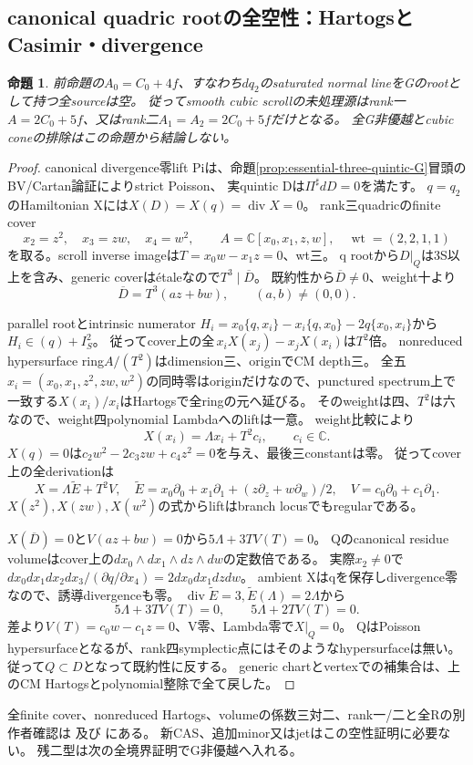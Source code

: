 \documentclass[a4paper,11pt]{ltjsarticle}
\newtheorem{proposition}{命題}[section]
\theoremstyle{definition}
\begin{document}
\subsection{canonical quadric rootの全空性：HartogsとCasimir・divergence}
\begin{proposition}\label{prop:cubic-scroll-canonical-root-empty}
前命題の$A_0=C_0+4f$、すなわち$dq_2$のsaturated normal lineをGのrootとして持つ全sourceは空。
従ってsmooth cubic scrollの未処理源はrank一$A=2C_0+5f$、又はrank二$A_1=A_2=2C_0+5f$だけとなる。
全G非優越とcubic coneの排除はこの命題から結論しない。
\end{proposition}
\begin{proof}
canonical divergence零lift Piは、命題\ref{prop:essential-three-quintic-G}冒頭のBV/Cartan論証によりstrict Poisson、
実quintic Dは$\Pi^\sharp dD=0$を満たす。
$q=q_2$のHamiltonian Xには$X(D)=X(q)=\operatorname{div}X=0$。
rank三quadricのfinite cover
\[
 x_2=z^2,\quad x_3=zw,\quad x_4=w^2,\qquad
 A=\mathbb C[x_0,x_1,z,w],\quad\operatorname{wt}=(2,2,1,1)
\]
を取る。scroll inverse imageは$T=x_0w-x_1z=0$、wt三。
q rootから$D|_Q$は3S以上を含み、generic coverはétaleなので$T^3\mid\overline D$。
既約性から$\overline D\ne0$、weight十より
\[
 \overline D=T^3(az+bw),\qquad(a,b)\ne(0,0).
\]

parallel rootとintrinsic numerator
$H_i=x_0\{q,x_i\}-x_i\{q,x_0\}-2q\{x_0,x_i\}$から$H_i\in(q)+I_S^2$。
従ってcover上の全$\,x_iX(x_j)-x_jX(x_i)$は$T^2$倍。
nonreduced hypersurface ring$A/(T^2)$はdimension三、originでCM depth三。
全五$x_i=(x_0,x_1,z^2,zw,w^2)$の同時零はoriginだけなので、punctured spectrum上で
一致する$X(x_i)/x_i$はHartogsで全ringの元へ延びる。
そのweightは四、$T^2$は六なので、weight四polynomial Lambdaへのliftは一意。
weight比較により
\[
 X(x_i)=\Lambda x_i+T^2c_i,\qquad c_i\in\mathbb C.
\]
$X(q)=0$は$c_2w^2-2c_3zw+c_4z^2=0$を与え、最後三constantは零。
従ってcover上の全derivationは
\[
 X=\Lambda\widetilde E+T^2V,\quad
 \widetilde E=x_0\partial_0+x_1\partial_1+(z\partial_z+w\partial_w)/2,
 \quad V=c_0\partial_0+c_1\partial_1.
\]
$X(z^2),X(zw),X(w^2)$の式からliftはbranch locusでもregularである。

$X(\overline D)=0$と$V(az+bw)=0$から$5\Lambda+3T V(T)=0$。
Qのcanonical residue volumeはcover上の$dx_0\wedge dx_1\wedge dz\wedge dw$の定数倍である。
実際$x_2\ne0$で$dx_0dx_1dx_2dx_3/(\partial q/\partial x_4)=2dx_0dx_1dzdw$。
ambient Xはqを保存しdivergence零なので、誘導divergenceも零。
$\operatorname{div}\widetilde E=3,\widetilde E(\Lambda)=2\Lambda$から
\[
 5\Lambda+3TV(T)=0,\qquad5\Lambda+2TV(T)=0.
\]
差より$V(T)=c_0w-c_1z=0$、V零、Lambda零で$X|_Q=0$。
QはPoisson hypersurfaceとなるが、rank四symplectic点にはそのようなhypersurfaceは無い。
従って$Q\subset D$となって既約性に反する。
generic chartとvertexでの補集合は、上のCM Hartogsとpolynomial整除で全て戻した。
\end{proof}
全finite cover、nonreduced Hartogs、volumeの係数三対二、rank一/二と全Rの別作者確認は
及び
にある。
新CAS、追加minor又はjetはこの空性証明に必要ない。
残二型は次の全境界証明でG非優越へ入れる。
\end{document}
